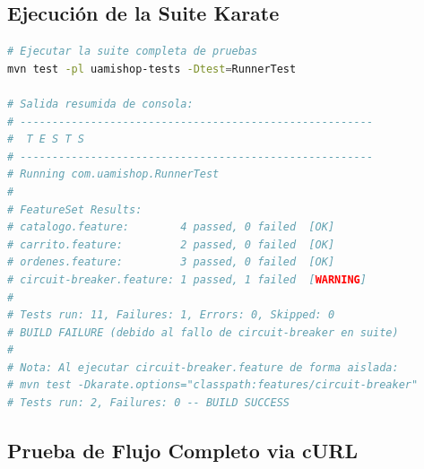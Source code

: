 \documentclass[12pt,a4paper]{article}
\begin{document}
\subsection{Ejecuci\'on de la Suite Karate}

\begin{lstlisting}[language=bash, caption={Comando de ejecuci\'on y salida resumida}]
# Ejecutar la suite completa de pruebas
mvn test -pl uamishop-tests -Dtest=RunnerTest

# Salida resumida de consola:
# -------------------------------------------------------
#  T E S T S
# -------------------------------------------------------
# Running com.uamishop.RunnerTest
#
# FeatureSet Results:
# catalogo.feature:        4 passed, 0 failed  [OK]
# carrito.feature:         2 passed, 0 failed  [OK]
# ordenes.feature:         3 passed, 0 failed  [OK]
# circuit-breaker.feature: 1 passed, 1 failed  [WARNING]
#
# Tests run: 11, Failures: 1, Errors: 0, Skipped: 0
# BUILD FAILURE (debido al fallo de circuit-breaker en suite)
#
# Nota: Al ejecutar circuit-breaker.feature de forma aislada:
# mvn test -Dkarate.options="classpath:features/circuit-breaker"
# Tests run: 2, Failures: 0 -- BUILD SUCCESS
\end{lstlisting}

\subsection{Prueba de Flujo Completo via cURL}
\end{document}
